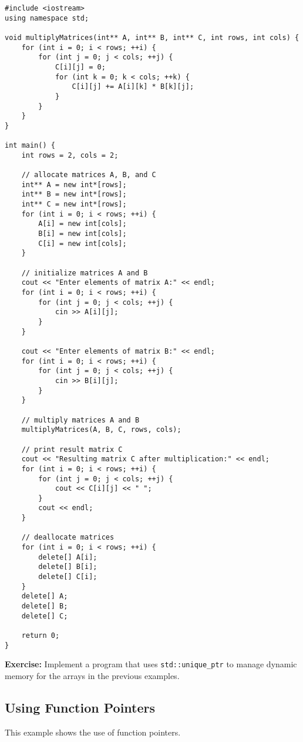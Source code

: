 \documentclass{article}
\begin{document}
\begin{verbatim}
#include <iostream>
using namespace std;

void multiplyMatrices(int** A, int** B, int** C, int rows, int cols) {
    for (int i = 0; i < rows; ++i) {
        for (int j = 0; j < cols; ++j) {
            C[i][j] = 0;
            for (int k = 0; k < cols; ++k) {
                C[i][j] += A[i][k] * B[k][j];
            }
        }
    }
}

int main() {
    int rows = 2, cols = 2;

    // allocate matrices A, B, and C
    int** A = new int*[rows];
    int** B = new int*[rows];
    int** C = new int*[rows];
    for (int i = 0; i < rows; ++i) {
        A[i] = new int[cols];
        B[i] = new int[cols];
        C[i] = new int[cols];
    }

    // initialize matrices A and B
    cout << "Enter elements of matrix A:" << endl;
    for (int i = 0; i < rows; ++i) {
        for (int j = 0; j < cols; ++j) {
            cin >> A[i][j];
        }
    }

    cout << "Enter elements of matrix B:" << endl;
    for (int i = 0; i < rows; ++i) {
        for (int j = 0; j < cols; ++j) {
            cin >> B[i][j];
        }
    }

    // multiply matrices A and B
    multiplyMatrices(A, B, C, rows, cols);

    // print result matrix C
    cout << "Resulting matrix C after multiplication:" << endl;
    for (int i = 0; i < rows; ++i) {
        for (int j = 0; j < cols; ++j) {
            cout << C[i][j] << " ";
        }
        cout << endl;
    }

    // deallocate matrices
    for (int i = 0; i < rows; ++i) {
        delete[] A[i];
        delete[] B[i];
        delete[] C[i];
    }
    delete[] A;
    delete[] B;
    delete[] C;

    return 0;
}
\end{verbatim}

\textbf{Exercise:} Implement a program that uses \texttt{std::unique\_ptr} to manage dynamic memory for the arrays in the previous examples.

\subsection*{Using Function Pointers}
This example shows the use of function pointers.
\end{document}
